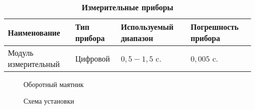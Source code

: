 \documentclass{article}
\begin{document}
\begin{table}[h]
	\caption{\bf Измерительные приборы}
\begin{tabular}[c]{|p{7.5em}|p{7.5em}|p{7.5em}| p{7.5em}|}
	\hline
Наименование & Тип прибора & Используемый диапазон & Погрешность прибора\\\hline
Модуль измерительный& Цифровой&$0{,}5 - 1{,}5$ c.&$ 0{,}005 $ c.\\
\hline
	\end{tabular}
\end{table}


\begin{figure}[h]
	\caption{Оборотный маятник}
\centering{\texttt{[image: q]}}
\end{figure}

\begin{figure}[h]
	\caption{Схема установки}
	\centering{\texttt{[image: w]}}
\end{figure}
\end{document}
